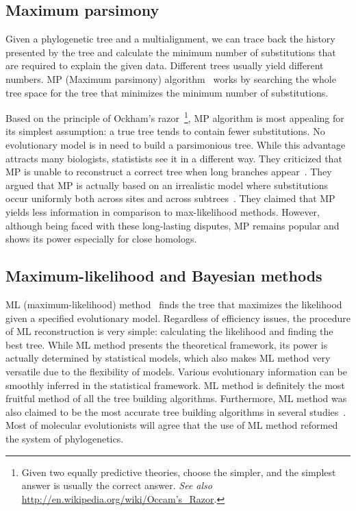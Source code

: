 \subsection{Maximum parsimony}
Given a phylogenetic tree and a multialignment, we can trace back the history
presented by the tree and calculate the minimum number of substitutions that are required
to explain the given data. Different trees usually yield different numbers.
MP (Maximum parsimony) algorithm~\cite{fitch71}
works by searching the whole tree space for the tree that minimizes the minimum number of substitutions.

Based on the principle of Ockham's
razor~\footnote{Given two equally predictive theories, choose the simpler,
and the simplest answer is usually the correct answer. {\it See also}
\href{http://en.wikipedia.org/wiki/Occam's\_Razor}{http://en.wikipedia.org/wiki/Occam's\_Razor}.},
MP algorithm is most appealing for its simplest
assumption: a true tree tends to contain fewer substitutions.
No evolutionary model is in need to build a parsimonious tree.
While this advantage attracts many biologists, statistists see it in a different way.
They criticized that MP is unable to reconstruct a correct tree when long branches appear~\cite{felsenstein78}.
They argued that MP is actually based on an irrealistic model where substitutions occur
uniformly both across sites and across subtrees~\cite{holder03}.
They claimed that MP yields less information in comparison to
max-likelihood methods. However, although being faced with these long-lasting disputes, MP
remains popular and shows its power especially for close homologs.

\subsection{Maximum-likelihood and Bayesian methods}
ML (maximum-likelihood) method~\cite{felsenstein81} finds the tree that maximizes the likelihood
given a specified evolutionary model. Regardless of efficiency issues, the procedure of ML reconstruction
is very simple: calculating the likelihood and finding the best tree.
While ML method presents the theoretical framework, its power is actually
determined by statistical models, which also makes ML method
very versatile due to the flexibility of models.
Various evolutionary information can be smoothly inferred in the statistical framework.
ML method is definitely the most fruitful method of all the tree building algorithms.
Furthermore, ML method was also claimed to be the
most accurate tree building algorithms in several studies~\cite{kuhner94,hall05}.
Most of molecular evolutionists will agree that the use of ML method reformed the system of phylogenetics.

